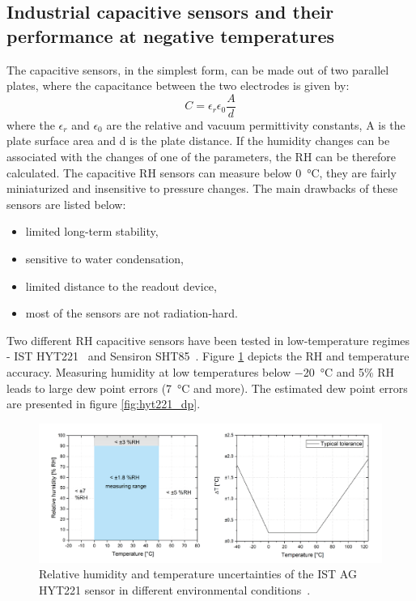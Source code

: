 \subsection{Industrial capacitive sensors and their performance at negative temperatures}
\label{capacitive_sensors}
The capacitive sensors, in the simplest form, can be made out of two parallel plates, where the capacitance between the two electrodes is given by:
\begin{equation}
C = \epsilon_{r}\epsilon_0\frac{A}{d}
\end{equation}
where the $\epsilon_{r}$ and $\epsilon_{0}$ are the relative and vacuum permittivity constants, A is the plate surface area and d is the plate distance. If the humidity changes can be associated with the changes of one of the parameters, the \gls{RH} can be therefore calculated. 
The capacitive \gls{RH} sensors can measure below \SI{0}{\celsius}, they are fairly miniaturized and insensitive to pressure changes. The main drawbacks of these sensors are listed below:
\begin{itemize}
    \item limited long-term stability,
    \item sensitive to water condensation,
    \item limited distance to the readout device,
    \item most of the sensors are not radiation-hard.
\end{itemize}
Two different \gls{RH} capacitive sensors have been tested in low-temperature regimes - IST HYT221~\cite{hyt221} and Sensiron SHT85~\cite{SHT85}. Figure \ref{fig:hyt221} depicts the \gls{RH} and temperature accuracy. Measuring humidity at low temperatures below \SI{-20}{\celsius} and 5\% \gls{RH} leads to large dew point errors (\SI{7}{\celsius} and more). The estimated dew point errors are presented in figure \ref{fig:hyt221_dp}.
\begin{figure}[!h]
\centering
\includegraphics[width=0.9\columnwidth]{Chapter5/images/hyt221_rh.png}
\caption{Relative humidity and temperature uncertainties of the IST AG HYT221 sensor in different environmental conditions~\cite{hyt221}.}
\label{fig:hyt221}
\end{figure}
